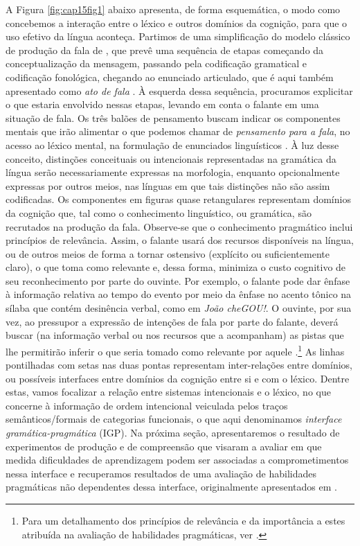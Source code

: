 \documentclass[output=paper,colorlinks,citecolor=brown,booklanguage=portuguese]{langscibook}
\begin{document}
A Figura \ref{fig:cap15fig1} abaixo apresenta, de forma esquemática, o modo como concebemos a interação entre o léxico e outros domínios da cognição, para que o uso efetivo da língua aconteça. Partimos de uma simplificação do modelo clássico de produção da fala de \citet{Levelt1989}, que prevê uma sequência de etapas começando da conceptualização da mensagem, passando pela codificação gramatical e codificação fonológica, chegando ao enunciado articulado, que é aqui também apresentado como \emph{ato de fala} \citep{Searle1969}. À esquerda dessa sequência, procuramos explicitar o que estaria envolvido nessas etapas, levando em conta o falante em uma situação de fala. Os três balões de pensamento buscam indicar os componentes mentais que irão alimentar o que podemos chamar de \emph{pensamento para a fala}, no acesso ao léxico mental, na formulação de enunciados linguísticos \citep{Slobin1996}. À luz desse conceito, distinções conceituais ou intencionais representadas na gramática da língua serão necessariamente expressas na morfologia, enquanto opcionalmente expressas por outros meios, nas línguas em que tais distinções não são assim codificadas. Os componentes em figuras quase retangulares representam domínios da cognição que, tal como o conhecimento linguístico, ou gramática, são recrutados na produção da fala. Observe-se que o conhecimento pragmático inclui princípios de relevância. Assim, o falante usará dos recursos disponíveis na língua, ou de outros meios de forma a tornar ostensivo (explícito ou suficientemente claro), o que toma como relevante e, dessa forma, minimiza o custo cognitivo de seu reconhecimento por parte do ouvinte. Por exemplo, o falante pode dar ênfase à informação relativa ao tempo do evento por meio da ênfase no acento tônico na sílaba que contém desinência verbal, como em \emph{João cheGOU!}. O ouvinte, por sua vez, ao pressupor a expressão de intenções de fala por parte do falante, deverá buscar (na informação verbal ou nos recursos que a acompanham) as pistas que lhe permitirão inferir o que seria tomado como relevante por aquele \citep{Sperber2001}.\footnote{Para um detalhamento dos princípios de relevância e da importância a estes atribuída na avaliação de habilidades pragmáticas, ver \citet{Longchamps2014}.} As linhas pontilhadas com setas nas duas pontas representam inter-relações entre domínios, ou possíveis interfaces entre domínios da cognição entre si e com o léxico. Dentre estas, vamos focalizar a relação entre sistemas intencionais e o léxico, no que concerne à informação de ordem intencional veiculada pelos traços semânticos/formais de categorias funcionais, o que aqui denominamos \emph{interface gramática-pragmática} (IGP). Na próxima seção, apresentaremos o resultado de experimentos de produção e de compreensão que visaram a avaliar em que medida dificuldades de aprendizagem podem ser associadas a comprometimentos nessa interface e recuperamos resultados de uma avaliação de habilidades pragmáticas não dependentes dessa interface, originalmente apresentados em \citet{Longchamps2014}. 
\end{document}
